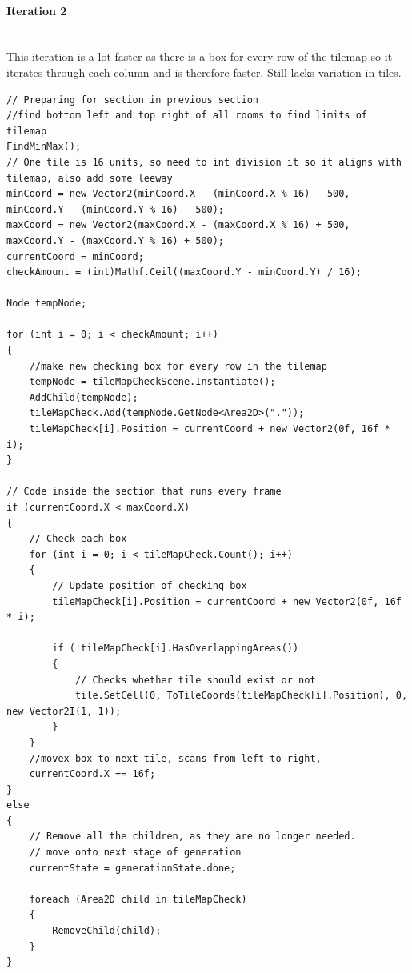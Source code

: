 \documentclass{article}
\newcommand{\myparagraph}[1]{\paragraph{#1}\mbox{}\\} %
\begin{document}
\myparagraph{Iteration 2}
This iteration is a lot faster as there is a box for every row of the tilemap so it iterates through each column and is therefore faster. Still lacks variation in tiles.
\begin{lstlisting}
// Preparing for section in previous section
//find bottom left and top right of all rooms to find limits of tilemap
FindMinMax();
// One tile is 16 units, so need to int division it so it aligns with tilemap, also add some leeway
minCoord = new Vector2(minCoord.X - (minCoord.X % 16) - 500, minCoord.Y - (minCoord.Y % 16) - 500);
maxCoord = new Vector2(maxCoord.X - (maxCoord.X % 16) + 500, maxCoord.Y - (maxCoord.Y % 16) + 500);
currentCoord = minCoord;
checkAmount = (int)Mathf.Ceil((maxCoord.Y - minCoord.Y) / 16);

Node tempNode;

for (int i = 0; i < checkAmount; i++)
{
	//make new checking box for every row in the tilemap
    tempNode = tileMapCheckScene.Instantiate();
    AddChild(tempNode);
    tileMapCheck.Add(tempNode.GetNode<Area2D>("."));
    tileMapCheck[i].Position = currentCoord + new Vector2(0f, 16f * i);
}

// Code inside the section that runs every frame
if (currentCoord.X < maxCoord.X)
{
    // Check each box
    for (int i = 0; i < tileMapCheck.Count(); i++)
    {
        // Update position of checking box
        tileMapCheck[i].Position = currentCoord + new Vector2(0f, 16f * i);

        if (!tileMapCheck[i].HasOverlappingAreas())
        {
            // Checks whether tile should exist or not
            tile.SetCell(0, ToTileCoords(tileMapCheck[i].Position), 0, new Vector2I(1, 1));
        }
    }
	//movex box to next tile, scans from left to right,
    currentCoord.X += 16f;
}
else
{
    // Remove all the children, as they are no longer needed.
    // move onto next stage of generation
    currentState = generationState.done;

    foreach (Area2D child in tileMapCheck)
    {
        RemoveChild(child);
    }
}

\end{lstlisting}
\end{document}
